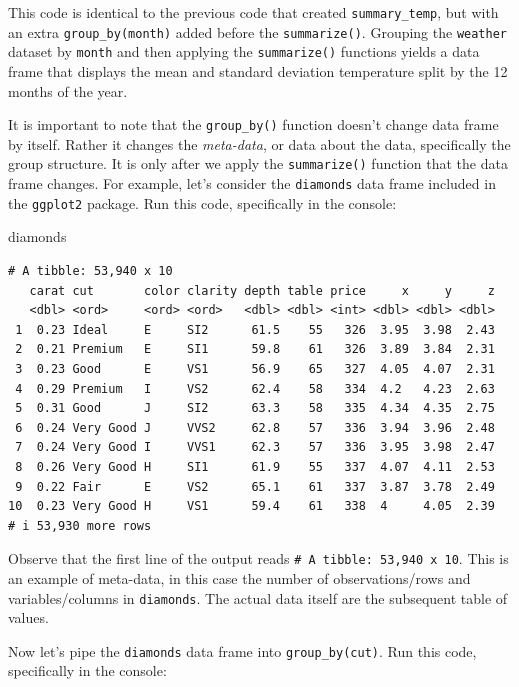 \documentclass[
  letterpaper,
  DIV=11,
  numbers=noendperiod]{scrreprt}
\newenvironment{Shaded}{\begin{snugshade}}{\end{snugshade}}
\newcommand{\NormalTok}[1]{\textcolor[rgb]{0.00,0.23,0.31}{#1}}
\theoremstyle{definition}
\theoremstyle{remark}
\begin{document}
This code is identical to the previous code that created
\texttt{summary\_temp}, but with an extra \texttt{group\_by(month)}
added before the \texttt{summarize()}. Grouping the \texttt{weather}
dataset by \texttt{month} and then applying the \texttt{summarize()}
functions yields a data frame that displays the mean and standard
deviation temperature split by the 12 months of the year.

It is important to note that the \texttt{group\_by()} function doesn't
change data frame by itself. Rather it changes the \emph{meta-data}, or
data about the data, specifically the group structure. It is only after
we apply the \texttt{summarize()} function that the data frame changes.
For example, let's consider the \texttt{diamonds} data frame included in
the \texttt{ggplot2} package. Run this code, specifically in the
console:

\begin{Shaded}
\begin{Highlighting}[]
\NormalTok{diamonds}
\end{Highlighting}
\end{Shaded}

\begin{verbatim}
# A tibble: 53,940 x 10
   carat cut       color clarity depth table price     x     y     z
   <dbl> <ord>     <ord> <ord>   <dbl> <dbl> <int> <dbl> <dbl> <dbl>
 1  0.23 Ideal     E     SI2      61.5    55   326  3.95  3.98  2.43
 2  0.21 Premium   E     SI1      59.8    61   326  3.89  3.84  2.31
 3  0.23 Good      E     VS1      56.9    65   327  4.05  4.07  2.31
 4  0.29 Premium   I     VS2      62.4    58   334  4.2   4.23  2.63
 5  0.31 Good      J     SI2      63.3    58   335  4.34  4.35  2.75
 6  0.24 Very Good J     VVS2     62.8    57   336  3.94  3.96  2.48
 7  0.24 Very Good I     VVS1     62.3    57   336  3.95  3.98  2.47
 8  0.26 Very Good H     SI1      61.9    55   337  4.07  4.11  2.53
 9  0.22 Fair      E     VS2      65.1    61   337  3.87  3.78  2.49
10  0.23 Very Good H     VS1      59.4    61   338  4     4.05  2.39
# i 53,930 more rows
\end{verbatim}

Observe that the first line of the output reads
\texttt{\#\ A\ tibble:\ 53,940\ x\ 10}. This is an example of meta-data,
in this case the number of observations/rows and variables/columns in
\texttt{diamonds}. The actual data itself are the subsequent table of
values.

Now let's pipe the \texttt{diamonds} data frame into
\texttt{group\_by(cut)}. Run this code, specifically in the console:
\end{document}
